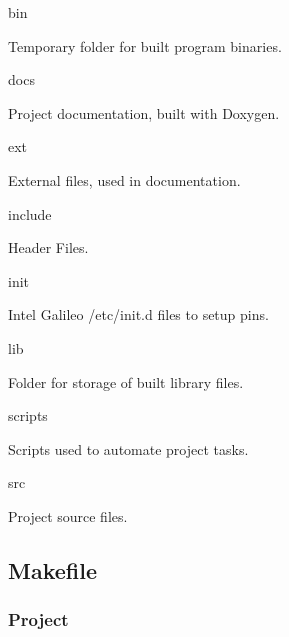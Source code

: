 \begin{DoxyItemize}
\item bin
\begin{DoxyItemize}
\item Temporary folder for built program binaries.
\end{DoxyItemize}
\item docs
\begin{DoxyItemize}
\item Project documentation, built with Doxygen.
\end{DoxyItemize}
\item ext
\begin{DoxyItemize}
\item External files, used in documentation.
\end{DoxyItemize}
\item include
\begin{DoxyItemize}
\item Header Files.
\end{DoxyItemize}
\item init
\begin{DoxyItemize}
\item Intel Galileo {\ttfamily /etc/init.d} files to setup pins.
\end{DoxyItemize}
\item lib
\begin{DoxyItemize}
\item Folder for storage of built library files.
\end{DoxyItemize}
\item scripts
\begin{DoxyItemize}
\item Scripts used to automate project tasks.
\end{DoxyItemize}
\item src
\begin{DoxyItemize}
\item Project source files.
\end{DoxyItemize}
\end{DoxyItemize}

\subsection*{Makefile}

\subsubsection*{Project}


